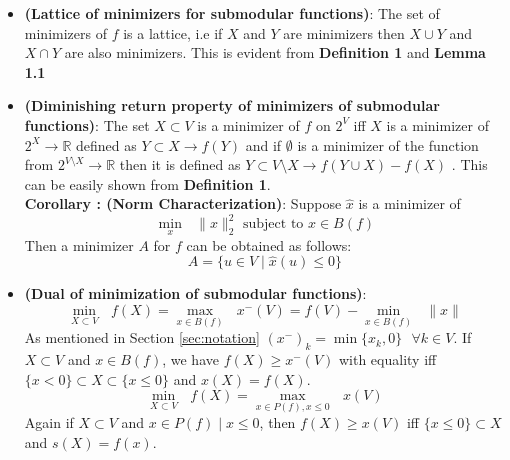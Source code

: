 \begin{itemize}
 \item {\bf \lemma (Lattice of minimizers for submodular functions)}: The set of minimizers of $f$ is a lattice, i.e if $X$ and $Y$ are minimizers then $X\cup Y$ and $X \cap Y$ are also minimizers. This is evident from {\bf Definition 1} and {\bf Lemma 1.1}\\

 \item {\bf \lemma (Diminishing return property of minimizers of submodular functions)}: The set $X \subset V$ is a minimizer of $f$ on $2^V$ iff $X$ is a minimizer of $2^X \rightarrow \mathds{R}$ defined as $Y \subset X \rightarrow f(Y)$ and if $\emptyset$ is a minimizer of the function from $2^{V\setminus X} \rightarrow \mathds{R}$  then it is defined as $Y \subset V\setminus X \rightarrow f(Y \cup X) - f(X)$ . This can be easily shown from {\bf Definition 1}.\\
 
  {\bf Corollary : (Norm Characterization)}: Suppose $\hat{x}$ is a minimizer of 
 \[
  \underset{x}{\operatorname{min }}\text{ } \| x\|_2^2 \text{ subject to } x\in B(f)
 \]
 Then a minimizer $A$ for $f$ can be obtained as follows:
 \[
   A = \{ u \in V \mid \hat{x}(u) \leq 0\}
 \]

  \item{\bf \lemma (Dual of minimization of submodular functions)}: \[ \underset{X \subset V}{\operatorname{min }}\text{ } f(X) =  \underset{x \in B(f) }{\operatorname{max }}\text{ } x^-(V) = f(V) - \underset{x \in B(f) }{\operatorname{min }}\text{ } \|x\| \]
  As mentioned in Section \ref{sec:notation} $(x^-)_k = \min\{x_k,0\} \text{ } \forall k \in V$. If $X \subset V$ and $x \in B(f)$, we have $f(X) \geq x^-(V)$ with equality iff $\{ x < 0 \} \subset X \subset \{ x\leq 0\}$ and $x(X) = f(X)$. \\
  \[
   \underset{X \subset V}{\operatorname{min }}\text{ } f(X) =  \underset{x \in P(f), x\leq 0 }{\operatorname{max }}\text{ } x(V)
  \]
  Again if $X\subset V$ and $x\in P(f) \mid x \leq 0$, then $f(X) \geq x(V)$ iff $\{x \leq 0 \} \subset X$ and $s(X) = f(x)$.\\

\end{itemize}

